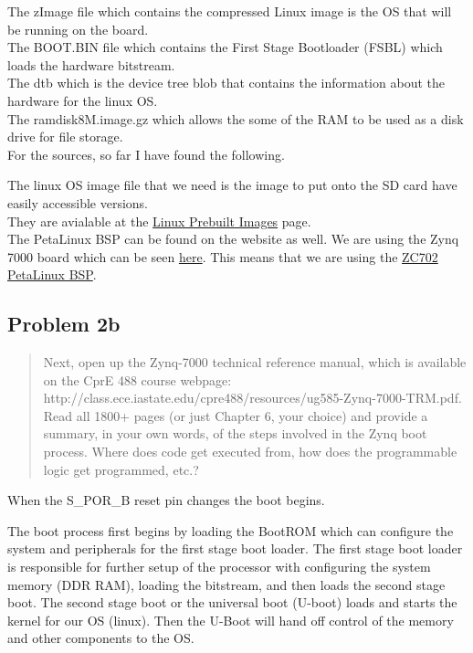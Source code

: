 \documentclass[10pt,a4paper]{article}
\let\oldsubsection\subsection
\renewcommand{\subsection}{%
    \setcounter{equation}{0}%
    \oldsubsection%
}
\begin{document}
The zImage file which contains the compressed Linux image is the OS that will be running on the board.\\
The BOOT.BIN file which contains the First Stage Bootloader (FSBL) which loads the hardware bitstream.\\
The dtb which is the device tree blob that contains the information about the hardware for the linux OS.\\
The ramdisk8M.image.gz which allows the some of the RAM to be used as a disk drive for file storage.\\ 

For the sources, so far I have found the following.

The linux OS image file that we need is the image to put onto the SD card have easily accessible versions.\\ 
They are avialable at the \href{https://xilinx-wiki.atlassian.net/wiki/spaces/A/pages/18842316/Linux+Prebuilt+Images}{Linux Prebuilt Images} page.\\

The PetaLinux BSP can be found on the website as well. We are using the Zynq 7000 board which can be seen \href{https://www.xilinx.com/products/boards-and-kits/ek-z7-zc702-g.html}{here}. This means that we are using the \href{https://www.xilinx.com/member/forms/download/xef.html?filename=xilinx-zc702-v2019.2-final.bsp}{ZC702 PetaLinux BSP}.\\


\subsection{Problem 2b}
\begin{quote}
Next, open up the Zynq-7000 technical reference manual, which is available on the CprE 488 course webpage:
http://class.ece.iastate.edu/cpre488/resources/ug585-Zynq-7000-TRM.pdf. Read all 1800+ pages (or just
Chapter 6, your choice) and provide a summary, in your own words, of the steps involved in the Zynq boot
process. Where does code get executed from, how does the programmable logic get programmed, etc.?\\
\end{quote}
When the S\_POR\_B reset pin changes the boot begins.

The boot process first begins by loading the BootROM which can configure the system and peripherals for the first stage boot loader. The first stage boot loader is responsible for further setup of the processor with configuring the system memory (DDR RAM), loading the bitstream, and then loads the second stage boot. The second stage boot or the universal boot (U-boot) loads and starts the kernel for our OS (linux). Then the U-Boot will hand off control of the memory and other components to the OS.\\
\end{document}
